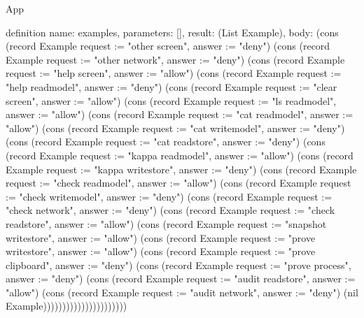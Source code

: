 \begin{lexlean}{App}
\begin{semanticmodule}
definition{
  name: examples,
  parameters: [],
  result: (List Example),
  body: (cons (record Example {request := "other screen", answer := "deny"}) (cons (record Example {request := "other network", answer := "deny"}) (cons (record Example {request := "help screen", answer := "allow"}) (cons (record Example {request := "help readmodel", answer := "deny"}) (cons (record Example {request := "clear screen", answer := "allow"}) (cons (record Example {request := "ls readmodel", answer := "allow"}) (cons (record Example {request := "cat readmodel", answer := "allow"}) (cons (record Example {request := "cat writemodel", answer := "deny"}) (cons (record Example {request := "cat readstore", answer := "deny"}) (cons (record Example {request := "kappa readmodel", answer := "allow"}) (cons (record Example {request := "kappa writestore", answer := "deny"}) (cons (record Example {request := "check readmodel", answer := "allow"}) (cons (record Example {request := "check writemodel", answer := "deny"}) (cons (record Example {request := "check network", answer := "deny"}) (cons (record Example {request := "check readstore", answer := "allow"}) (cons (record Example {request := "snapshot writestore", answer := "allow"}) (cons (record Example {request := "prove writestore", answer := "allow"}) (cons (record Example {request := "prove clipboard", answer := "deny"}) (cons (record Example {request := "prove process", answer := "deny"}) (cons (record Example {request := "audit readstore", answer := "allow"}) (cons (record Example {request := "audit network", answer := "deny"}) (nil Example))))))))))))))))))))))
}
\end{semanticmodule}
\end{lexlean}
